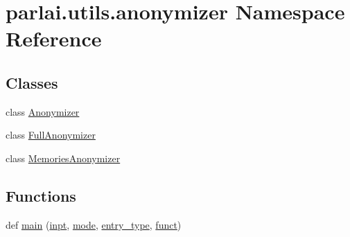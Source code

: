 \hypertarget{namespaceparlai_1_1utils_1_1anonymizer}{}\section{parlai.\+utils.\+anonymizer Namespace Reference}
\label{namespaceparlai_1_1utils_1_1anonymizer}
\subsection*{Classes}
\begin{DoxyCompactItemize}
\item 
class \hyperlink{classparlai_1_1utils_1_1anonymizer_1_1Anonymizer}{Anonymizer}
\item 
class \hyperlink{classparlai_1_1utils_1_1anonymizer_1_1FullAnonymizer}{Full\+Anonymizer}
\item 
class \hyperlink{classparlai_1_1utils_1_1anonymizer_1_1MemoriesAnonymizer}{Memories\+Anonymizer}
\end{DoxyCompactItemize}
\subsection*{Functions}
\begin{DoxyCompactItemize}
\item 
def \hyperlink{namespaceparlai_1_1utils_1_1anonymizer_a388eedb16f0bdab16de2cdf114c81ed3}{main} (\hyperlink{namespaceparlai_1_1utils_1_1anonymizer_ad5bd5ae637129dc0eb9f5496c1f96ad6}{inpt}, \hyperlink{namespaceparlai_1_1utils_1_1anonymizer_a1afb59b95af0bd5a9921c81690d2d0d5}{mode}, \hyperlink{namespaceparlai_1_1utils_1_1anonymizer_aba216f1839606e5e3bda852adf784433}{entry\+\_\+type}, \hyperlink{namespaceparlai_1_1utils_1_1anonymizer_addfbf956944824344200d1b52b62d2a4}{funct})
\end{DoxyCompactItemize}
